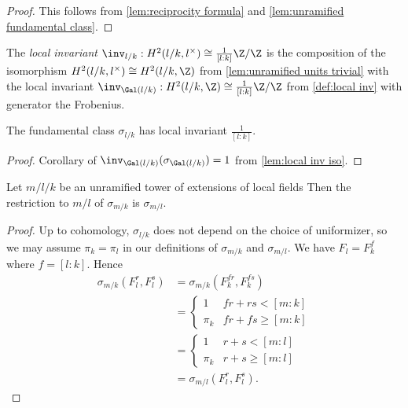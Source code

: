\begin{proof}
	This follows from \ref{lem:reciprocity formula} and \ref{lem:unramified fundamental class}.
\end{proof}


\begin{definition} \label{def:unramified local inv}

	The \emph{local invariant} $\inv_{l/k} : H^2(l/k, l^\times) \cong \frac{1}{[l:k]}\Z / \Z$ is the
	composition of the isomorphism $H^2(l/k, l^\times) \cong H^2(l/k, \Z)$
	from \ref{lem:unramified units trivial} with the local invariant
	$\inv_{\Gal(l/k)} : H^2(l/k, \Z) \cong \frac{1}{[l:k]}\Z / \Z$ from \ref{def:local inv} with
  generator the Frobenius.
\end{definition}

\begin{lemma} \label{lem:local inv fundamental class}
	The fundamental class $\sigma_{l/k}$ has local invariant $\frac{1}{[l:k]}$.
\end{lemma}

\begin{proof}
	Corollary of $\inv_{\Gal(l/k)}(\sigma_{\Gal(l/k)}) = 1$ from \ref{lem:local inv iso}.
\end{proof}


\begin{lemma} \label{lem:local unram rest}
	Let $m / l / k$ be an unramified tower of extensions of local fields
	Then the restriction to $m/l$ of $\sigma_{m/k}$ is $\sigma_{m/l}$.
\end{lemma}

\begin{proof}
	Up to cohomology, $\sigma_{l/k}$ does not depend on the choice of
	uniformizer, so we may assume $\pi_k=\pi_l$
	in our definitions of $\sigma_{m/k}$ and $\sigma_{m/l}$.
	We have $F_l = F_k^f$ where $f = [l:k]$.
	Hence
	\begin{align*}
		\sigma_{m/k}(F_l^r, F_l^s)
		&=
		\sigma_{m/k}(F_k^{fr}, F_k^{fs})\\
		&=
		\begin{cases}
			1 & fr + rs < [m:k] \\
			\pi_k & fr + fs \ge [m:k]
		\end{cases}\\
		&=
		\begin{cases}
			1 & r + s < [m:l] \\
			\pi_k & r + s \ge [m:l]
		\end{cases}\\
		&=\sigma_{m/l}(F_l^r,F_l^s).
	\end{align*}
\end{proof}



